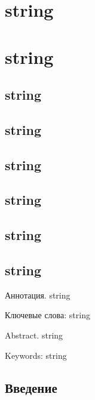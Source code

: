 \documentclass{article}%
\begin{document}
%
\pagestyle{empty}%
\normalsize%
%
\fontsize{12}{12pt}\selectfont%
\begin{center}%
\section*{string}%
\label{sec:string}%

%
\section*{string}%
\label{sec:string}%

%
\subsection*{string}%
\label{subsec:string}%

%
\subsection*{string}%
\label{subsec:string}%

%
\subsection*{string}%
\label{subsec:string}%

%
\subsection*{string}%
\label{subsec:string}%

%
\subsection*{string}%
\label{subsec:string}%

%
\subsection*{string}%
\label{subsec:string}%

%
\end{center}%
Аннотация. string%
\newline%
\par%
Ключевые слова: string%
\newline%
\par%
Abstract. string%
\newline%
\par%
Keywords: string%
\subsection*{Введение}%
\label{subsec:}%
\end{document}
